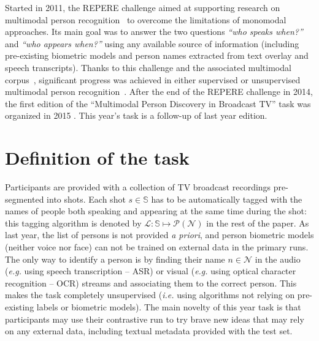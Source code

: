 \documentclass{acm_proc_article-me}
\newcommand\shots{\mathbb{S}}
\newcommand\hypLabels{\mathcal{L}}
\newcommand\hypNames{\mathcal{N}}
\begin{document}
Started in 2011, the REPERE challenge aimed at supporting research on multimodal person recognition~\cite{BERNARD--SLAM--2013, KAHN--CBMI--2012} to overcome the limitations of monomodal approaches. Its main goal was to answer the two questions \emph{``who speaks when?''} and \emph{``who appears when?''} using any available source of information (including pre-existing biometric models and person names extracted from text overlay and speech transcripts). Thanks to this challenge and the associated multimodal corpus~\cite{GIRAUDEL--LREC--2012}, significant progress was achieved in either supervised or unsupervised multimodal person recognition~\cite{BECHET--INTERSPEECH--2014, BENDRIS--CBMI--2013, BREDIN--ODYSSEY--2014, BREDIN--INTERSPEECH--2013, BREDIN--SLAM--2013, BREDIN--IJMIR--2014, FAVRE--SLAM--2013, GAY--CBMI--2014, POIGNANT--ASLP--2015, POIGNANT--SLAM--2013, POIGNANT--INTERSPEECH--2012, POIGNANT--MTAP--2015, ROUVIER--CBMI--2014}.
After the end of the REPERE challenge in 2014, the  first edition of the ``Multimodal Person Discovery in Broadcast TV'' task was organized in 2015 \cite{POIGNANT--MEDIAEVAL--2015}. This year's task is a follow-up of last year edition.

\vspace{-0.1cm}
\section{Definition of the task}

Participants are provided with a collection of TV broadcast recordings pre-segmented into shots.
Each shot $s \in \shots$ has to be automatically tagged with the names of people both speaking and appearing at the same time during the shot: this tagging algorithm is denoted by $\hypLabels : \shots \mapsto \mathcal{P}(\hypNames)$ in the rest of the paper.
As last year, the list of persons is not provided \emph{a priori}, and person biometric models (neither voice nor face) can not be trained on external data in the primary runs. The only way to identify a person is by finding their name $n \in \hypNames$ in the audio (\emph{e.g.} using speech transcription -- ASR) or visual (\emph{e.g.} using optical character recognition -- OCR) streams and associating them to the correct person. This makes the task completely unsupervised (\emph{i.e.} using algorithms not relying on pre-existing labels or biometric models). The main novelty of this year task is that participants may use their contrastive run to try brave new ideas that may rely on any external data, including textual metadata provided with the test set.
\end{document}
